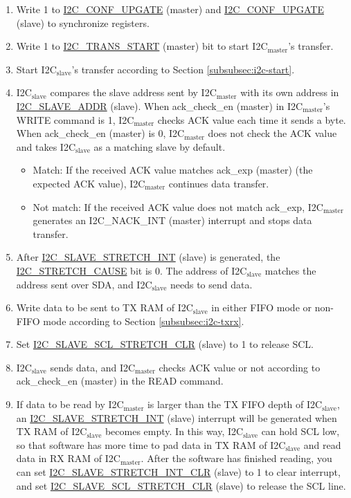 \documentclass[main\_\_EN.tex]{subfiles}
\begin{document}
\begin{enumerate}
\item Write 1 to \hyperref[fielddesc:I2CCONFUPGATE]{I2C\_CONF\_UPGATE} (master) and \hyperref[fielddesc:I2CCONFUPGATE]{I2C\_CONF\_UPGATE} (slave) to synchronize registers.
\item Write 1 to \hyperref[fielddesc:I2CTRANSSTART]{I2C\_TRANS\_START} (master) bit to start I2C$_\text{master}$'s transfer.
\item Start I2C$_\text{slave}$'s transfer according to Section \ref{subsubsec:i2c-start}.
\item I2C$_\text{slave}$ compares the slave address sent by I2C$_\text{master}$ with its own address in \hyperref[fielddesc:I2CSLAVEADDR]{I2C\_SLAVE\_ADDR} (slave). When ack\_check\_en (master) in I2C$_\text{master}$'s WRITE command is 1, I2C$_\text{master}$ checks ACK value each time it sends a byte. When ack\_check\_en (master) is 0, I2C$_\text{master}$ does not check the ACK value and takes I2C$_\text{slave}$ as a matching slave by default.
\begin{itemize}
\item Match: If the received ACK value matches ack\_exp (master) (the expected ACK value), I2C$_\text{master}$ continues data transfer.
\item Not match: If the received ACK value does not match ack\_exp, I2C$_\text{master}$ generates an I2C\_NACK\_INT (master) interrupt and stops data transfer.
\end{itemize}

\item After \hyperref[int:i2c-slave-stretch]{I2C\_SLAVE\_STRETCH\_INT} (slave) is generated, the \hyperref[fielddesc:I2CSTRETCHCAUSE]{I2C\_STRETCH\_CAUSE} bit is 0. The address of I2C$_\text{slave}$ matches the address sent over SDA, and I2C$_\text{slave}$ needs to send data.
\item Write data to be sent to TX RAM of I2C$_\text{slave}$ in either FIFO mode or non-FIFO mode according to Section \ref{subsubsec:i2c-txrx}.
\item Set \hyperref[fielddesc:I2CSLAVESCLSTRETCHCLR]{I2C\_SLAVE\_SCL\_STRETCH\_CLR} (slave) to 1 to release SCL.

\item I2C$_\text{slave}$ sends data, and I2C$_\text{master}$ checks ACK value or not according to ack\_check\_en (master) in the READ command.

\item If data to be read by I2C$_\text{master}$ is larger than the TX FIFO depth of I2C$_\text{slave}$, an \hyperref[int:i2c-slave-stretch]{I2C\_SLAVE\_STRETCH\_INT} (slave) interrupt will be generated when TX RAM of I2C$_\text{slave}$ becomes empty. In this way, I2C$_\text{slave}$ can hold SCL low, so that software has more time to pad data in TX RAM of I2C$_\text{slave}$ and read data in RX RAM of I2C$_\text{master}$. After the software has finished reading, you can set \hyperref[fielddesc:I2CSLAVESTRETCHINTCLR]{I2C\_SLAVE\_STRETCH\_INT\_CLR} (slave) to 1 to clear interrupt, and set \hyperref[fielddesc:I2CSLAVESCLSTRETCHCLR]{I2C\_SLAVE\_SCL\_STRETCH\_CLR} (slave) to release the SCL line.


\end{enumerate}
\end{document}
